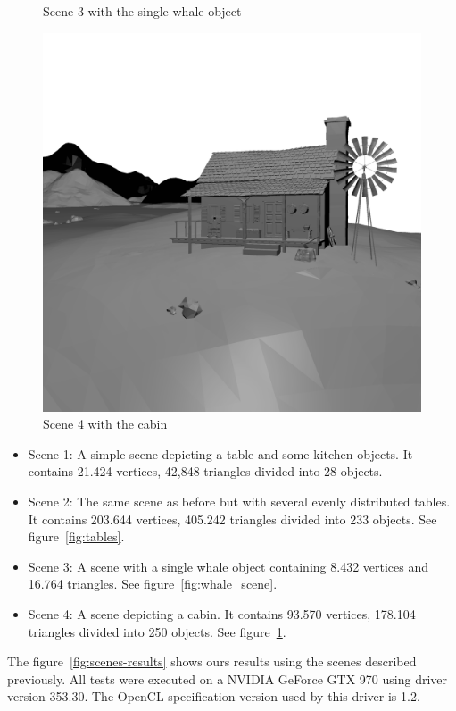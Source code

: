 \documentclass{vgtc}
\begin{document}
\begin{figure}[!hbt]
  \caption{Scene 3 with the single whale object}\label{fig:whale_scene}
\endminipage
{}%
  \includegraphics[width=\linewidth]{cabin.png}
  \caption{Scene 4 with the cabin}\label{fig:cabin_scene}
\endminipage
\end{figure}

\begin{itemize}
\item Scene 1: A simple scene depicting a table and some kitchen
  objects. It contains 21.424 vertices, 42,848 triangles divided into
  28 objects.
\item Scene 2: The same scene as before but with several evenly
  distributed tables. It contains 203.644 vertices, 405.242 triangles
  divided into 233 objects. See figure~\ref{fig:tables}.
\item Scene 3: A scene with a single whale object containing 8.432
  vertices and 16.764 triangles. See figure~\ref{fig:whale_scene}.
\item Scene 4: A scene depicting a cabin. It contains 93.570 vertices,
  178.104 triangles divided into 250 objects. See
  figure~\ref{fig:cabin_scene}.
\end{itemize}

The figure~\ref{fig:scenes-results} shows ours results using the
scenes described previously. All tests were executed on a NVIDIA GeForce GTX
970 using driver version 353.30. The OpenCL specification
version used by this driver is 1.2.
\end{document}
